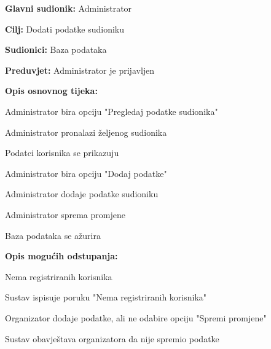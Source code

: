 	\noindent {}
	\begin{packed_item}
		
		\item \textbf{Glavni sudionik: }Administrator
		\item  \textbf{Cilj:} Dodati podatke sudioniku
		\item  \textbf{Sudionici:} Baza podataka
		\item  \textbf{Preduvjet:} Administrator je prijavljen
		\item  \textbf{Opis osnovnog tijeka:}
		
		\item[] \begin{packed_enum}
			
			\item Administrator bira opciju "Pregledaj podatke sudionika"
			\item Administrator pronalazi željenog sudionika
			\item Podatci korisnika se prikazuju
			\item Administrator bira opciju "Dodaj podatke"
			\item Administrator dodaje podatke sudioniku
			\item Administrator sprema promjene
			\item Baza podataka se ažurira
			
		\end{packed_enum}
		
		\item  \textbf{Opis mogućih odstupanja:}
		
		\item[] \begin{packed_item}
			
			\item[1.a] Nema registriranih korisnika
			\item[] \begin{packed_enum}
				\item Sustav ispisuje poruku "Nema registriranih korisnika"
				
			\end{packed_enum}
			
			\item[5.a] Organizator dodaje podatke, ali ne odabire opciju "Spremi promjene"
			\item[] \begin{packed_enum}
				\item Sustav obavještava organizatora da nije spremio podatke
				
			\end{packed_enum}
		\end{packed_item}
	\end{packed_item}

